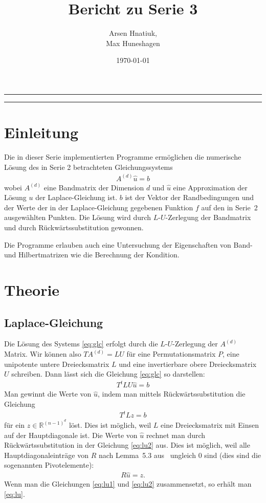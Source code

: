 \documentclass[smallheadings]{scrartcl}
\title{Bericht zu Serie 3}
\author{%
  Arsen Hnatiuk,\\%
  Max Huneshagen 
}
\date{\today}
\numberwithin{equation}{section}
\begin{document}
\maketitle
\tableofcontents
\bigskip

\hrule
\hrule


\section{Einleitung}

Die in dieser Serie implementierten Programme ermöglichen die numerische Lösung des in Serie 2 betrachteten Gleichungssystems
\begin{align}
A^{(d)}\hat{u} = b
\label{eq:glc}
\end{align}
wobei $A^{(d)}$ eine Bandmatrix der Dimension $d$ und $\hat{u}$ eine Approximation der Lösung $u$ der Laplace-Gleichung ist. $b$ ist der Vektor der Randbedingungen und der Werte der in der Laplace-Gleichung gegebenen Funktion $f$ auf den in Serie~2 ausgewählten Punkten. Die Lösung wird durch $L$-$U$-Zerlegung der Bandmatrix und durch Rückwärtssubstitution gewonnen.

Die Programme erlauben auch eine Untersuchung der Eigenschaften von Band- und Hilbertmatrizen wie die Berechnung der Kondition.

\section{Theorie}
\label{sec:theo}
\subsection{Laplace-Gleichung}
Die Lösung des Systems \ref{eq:glc} erfolgt durch die $L$-$U$-Zerlegung der $A^{(d)}$ Matrix. Wir können also $TA^{(d)}=LU$ für eine Permutationsmatrix $P$, eine unipotente untere Dreiecksmatrix $L$ und eine invertierbare obere Dreiecksmatrix $U$ schreiben. Dann lässt sich die Gleichung \ref{eq:glc} so darstellen:
\begin{align}
	T^tLU\hat{u}=b
	\label{eq:lu}
\end{align}
Man gewinnt die Werte von $\hat{u}$, indem man mittels Rückwärtssubstitution die Gleichung 
\begin{align}
	T^tLz=b
	\label{eq:lu1}
\end{align}
für ein $z\in \mathbb{R}^{(n-1)^d}$ löst. Dies ist möglich, weil $L$ eine Dreiecksmatrix mit Einsen auf der Hauptdiagonale ist. Die Werte von $\hat{u}$ rechnet man durch Rückwärtssubstitution in der Gleichung \eqref{eq:lu2} aus. Dies ist möglich, weil alle Hauptdiagonaleinträge von $R$ nach Lemma~5.3 aus~\cite{nla} ungleich $0$ sind (dies sind die sogenannten Pivotelemente):
\begin{align}
	R\hat{u}=z.
	\label{eq:lu2}
\end{align}
Wenn man die Gleichungen \eqref{eq:lu1} und \eqref{eq:lu2} zusammensetzt, so erhält man \eqref{eq:lu}.
\end{document}

